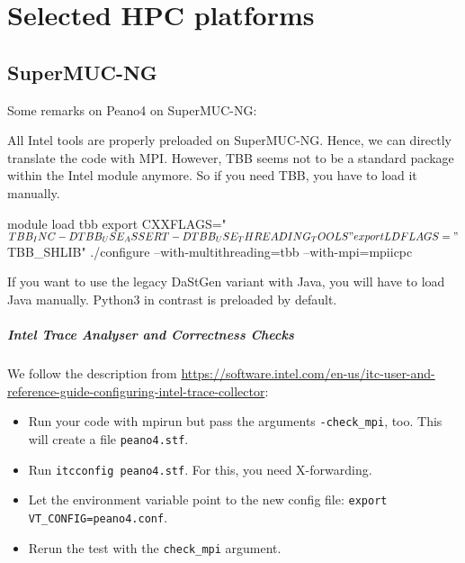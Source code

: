 \chapter{Selected HPC platforms}


\section{SuperMUC-NG}

%
Some remarks on Peano4 on SuperMUC-NG:



\noindent
All Intel tools are properly preloaded on SuperMUC-NG.
Hence, we can directly translate the code with MPI. 
However, TBB seems not to be a standard package within the Intel module anymore. 
So if you need TBB, you have to load it manually.

\begin{code}
module load tbb
export CXXFLAGS="$TBB_INC  -DTBB_USE_ASSERT -DTBB_USE_THREADING_TOOLS"
export LDFLAGS="$TBB_SHLIB"
./configure --with-multithreading=tbb --with-mpi=mpiicpc
\end{code}



\noindent
If you want to use the legacy DaStGen variant with Java, you will have to load
Java manually.
Python3 in contrast is preloaded by default.



\paragraph{Intel Trace Analyser and Correctness Checks}


We follow the description from \url{https://software.intel.com/en-us/itc-user-and-reference-guide-configuring-intel-trace-collector}:

\begin{itemize}
  \item Run your code with mpirun but pass the arguments \texttt{-check_mpi}, too. This will create a file \texttt{peano4.stf}.
  \item Run \texttt{itcconfig peano4.stf}. For this, you need X-forwarding.
  \item Let the environment variable point to the new config file: \texttt{export VT_CONFIG=peano4.conf}.
  \item Rerun the test with the \texttt{check_mpi} argument.
\end{itemize}




